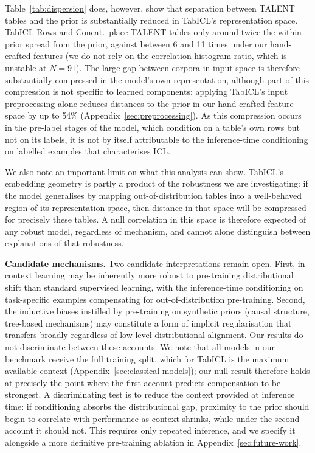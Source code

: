 \documentclass{article}
\begin{document}
Table~\ref{tab:dispersion} does, however, show that separation between TALENT tables and the prior is substantially reduced in TabICL's representation space.
TabICL Rows and Concat.\ place TALENT tables only around twice the within-prior spread from the prior, against between 6 and 11 times under our hand-crafted features (we do not rely on the correlation histogram ratio, which is unstable at $N = 91$).
The large gap between corpora in input space is therefore substantially compressed in the model's own representation, although part of this compression is not specific to learned components: applying TabICL's input preprocessing alone reduces distances to the prior in our hand-crafted feature space by up to 54\% (Appendix~\ref{sec:preprocessing}).
As this compression occurs in the pre-label stages of the model, which condition on a table's own rows but not on its labels, it is not by itself attributable to the inference-time conditioning on labelled examples that characterises ICL.

We also note an important limit on what this analysis can show.
TabICL's embedding geometry is partly a product of the robustness we are investigating: if the model generalises by mapping out-of-distribution tables into a well-behaved region of its representation space, then distance in that space will be compressed for precisely these tables.
A null correlation in this space is therefore expected of any robust model, regardless of mechanism, and cannot alone distinguish between explanations of that robustness.

\textbf{Candidate mechanisms.} Two candidate interpretations remain open.
First, in-context learning may be inherently more robust to pre-training distributional shift than standard supervised learning, with the inference-time conditioning on task-specific examples compensating for out-of-distribution pre-training.
Second, the inductive biases instilled by pre-training on synthetic priors (causal structure, tree-based mechanisms) may constitute a form of implicit regularisation that transfers broadly regardless of low-level distributional alignment.
Our results do not discriminate between these accounts.
We note that all models in our benchmark receive the full training split, which for TabICL is the maximum available context (Appendix~\ref{sec:classical-models}); our null result therefore holds at precisely the point where the first account predicts compensation to be strongest.
A discriminating test is to reduce the context provided at inference time: if conditioning absorbs the distributional gap, proximity to the prior should begin to correlate with performance as context shrinks, while under the second account it should not.
This requires only repeated inference, and we specify it alongside a more definitive pre-training ablation in Appendix~\ref{sec:future-work}.
\end{document}
